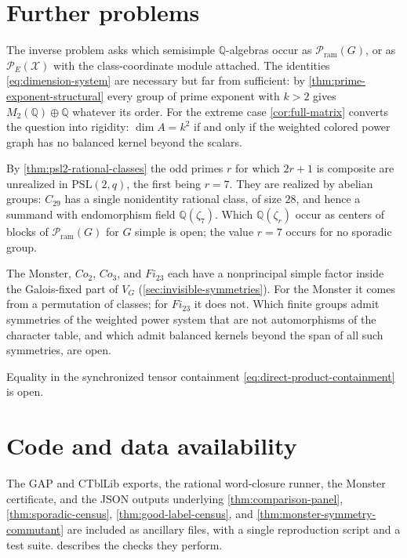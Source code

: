 \documentclass[11pt,reqno]{amsart}
\numberwithin{equation}{section}
\theoremstyle{remark}
\theoremstyle{plain}
\newcommand{\Q}{\mathbb Q}
\newcommand{\PE}{\mathcal P_E}
\newcommand{\Pram}{\mathcal P_{\mathrm{ram}}}
\newcommand{\1}{\mathbf 1}
\begin{document}
\section{Further problems}
\label{sec:open-problems}

The inverse problem asks which semisimple \(\Q\)-algebras occur as
\(\Pram(G)\), or as \(\PE(\mathscr X)\) with the class-coordinate module
attached.  The identities \eqref{eq:dimension-system} are necessary but far
from sufficient: by \cref{thm:prime-exponent-structural} every group of prime
exponent with \(k>2\) gives \(M_2(\Q)\oplus\Q\) whatever its order.  For the
extreme case \cref{cor:full-matrix} converts the question into rigidity:
\(\dim A=k^2\) if and only if the weighted colored power graph has no
balanced kernel beyond the scalars.

By \cref{thm:psl2-rational-classes} the odd primes \(r\) for which \(2r+1\) is
composite are unrealized in \(\mathrm{PSL}(2,q)\), the first being \(r=7\).
They are realized by abelian groups: \(C_{29}\) has a single nonidentity
rational class, of size \(28\), and hence a summand with endomorphism field
\(\Q(\zeta_7)\).  Which \(\Q(\zeta_r)\) occur as centers of blocks of
\(\Pram(G)\) for \(G\) simple is open; the value \(r=7\) occurs for no
sporadic group.

The Monster, \(Co_2\), \(Co_3\), and \(Fi_{23}\) each have a nonprincipal
simple factor inside the Galois-fixed part of \(V_G\)
(\cref{sec:invisible-symmetries}).  For the Monster it comes from a
permutation of classes; for \(Fi_{23}\) it does not.  Which finite groups
admit symmetries of the weighted power system that are not automorphisms of
the character table, and which admit balanced kernels beyond the span of
all such symmetries, are open.

Equality in the synchronized tensor containment
\eqref{eq:direct-product-containment} is open.

\section*{Code and data availability}

The GAP and CTblLib exports, the rational word-closure runner, the
Monster certificate, and the JSON outputs underlying
\cref{thm:comparison-panel}, \cref{thm:sporadic-census},
\cref{thm:good-label-census}, and \cref{thm:monster-symmetry-commutant}
are included as ancillary files, with a single reproduction script and a
test suite.   describes the checks they perform.
\end{document}
